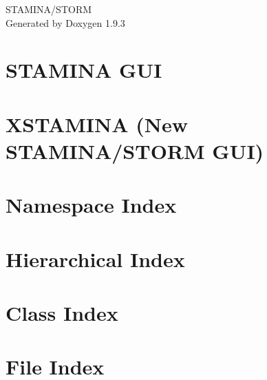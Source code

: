 \documentclass[twoside]{book}
\newcommand{\+}{\discretionary{\mbox{\scriptsize$\hookleftarrow$}}{}{}}
\newcommand{\clearemptydoublepage}{%
    \newpage{\pagestyle{empty}\cleardoublepage}%
  }
\begin{document}
  \raggedbottom
    \hypersetup{pageanchor=false,
                bookmarksnumbered=true,
                pdfencoding=unicode
               }
  \begin{titlepage}
  \vspace*{7cm}
  \begin{center}%
  {\Large STAMINA/\+STORM}\\
  \vspace*{1cm}
  {\large Generated by Doxygen 1.9.3}\\
  \end{center}
  \end{titlepage}
  \clearemptydoublepage
  \tableofcontents
  \clearemptydoublepage
  \hypersetup{pageanchor=true}
\chapter{STAMINA GUI}
\label{md__home_josh_Documents_Work_stamina_cplusplus_src_gui_depricated_README}

\chapter{XSTAMINA (New STAMINA/\+STORM GUI)}
\label{md__home_josh_Documents_Work_stamina_cplusplus_src_stamina_gui_README}

\chapter{Namespace Index}

\chapter{Hierarchical Index}

\chapter{Class Index}

\chapter{File Index}

\end{document}

